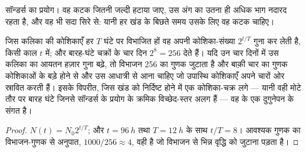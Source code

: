 \begin{omfigure}

{\small सॉन्डर्स का प्रयोग। वह कटक जितनी जल्दी हटाया जाए, उस अंग का
उतना ही अधिक भाग नदारद रहता है, और वह भी सदा सिरे से: यानी हर खंड के
बिछते समय उसके लिए वह कटक चाहिए।}
\end{omfigure}

\begin{theorem}[विभाजन से वृद्धि]\label{thm:b2:limb-organogenesis:growth}
जिस कलिका की कोशिकाएँ हर $T$ घंटे पर विभाजित हों वह अपनी
कोशिका-संख्या $2^{t/T}$ गुना कर लेती है, किसी काल $t$ में; और बारह-घंटे चक्रों के चार दिन
$2^{8} = 256$ देते हैं। यदि उन चार दिनों में उस कलिका का आयतन हज़ार गुना
बढ़े, तो विभाजन 256 का गुणक जुटाता है और बाक़ी
चार का गुणक कोशिकाओं के बड़े होने से और उस आधात्री से आना चाहिए जो
उपास्थि कोशिकाएँ अपने चारों ओर स्रावित करती हैं। इसके विपरीत, जिस
खंड को निर्दिष्ट होने में एक कोशिका-चक्र लगे --- यानी वही मोटे तौर पर
बारह घंटे जिनसे सॉन्डर्स के प्रयोग के क्रमिक विच्छेद-स्तर अलग हैं ---
वह  के एक दुगुनेपन के संगत है।
\end{theorem}
\begin{proof}
$N(t) = N_0 2^{t/T}$; और $t = \qty{96}{h}$ तथा $T = \qty{12}{h}$ के साथ
$t/T = 8$। आवश्यक गुणक का विभाजन-गुणक से अनुपात,
$1000/256 \approx 4$, वही है जो विभाजन से भिन्न वृद्धि को
जुटाना पड़ता है।
\end{proof}

